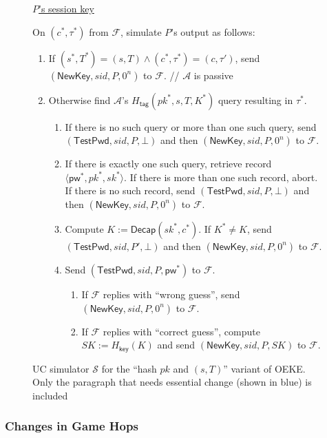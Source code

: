 \documentclass{article}
\theoremstyle{plain}
\theoremstyle{definition}
\theoremstyle{remark}
\newcommand{\adv}{\mathcal{A}}
\renewcommand{\sim}{\mathcal{S}}
\newcommand{\func}{\mathcal{F}}
\newcommand{\Decap}{\mathsf{Decap}}
\newcommand{\Hkey}{H_\mathsf{key}}
\newcommand{\Htag}{H_\mathsf{tag}}
\newcommand{\pw}{\mathsf{pw}}
\newcommand{\TestPwd}{\mathsf{TestPwd}}
\newcommand{\NewKey}{\mathsf{NewKey}}
\begin{document}
\begin{figure}[H]
\begin{framed}
\begin{small}
\underline{$P$'s session key}

\medskip
On $(c^*,\tau^*)$ from $\func$, simulate $P$'s output as follows:
\begin{enumerate}
  \item If $(s^*,T^*) = (s,T) \land (c^*,\tau^*) = (c,\tau')$, send $(\NewKey, sid, P, 0^n)$ to $\func$. \quad \textcolor[gray]{0.5}{// $\adv$ is passive}
  \item Otherwise find $\adv$'s {\color{blue}$\Htag(pk^*,s,T,K^*)$} query resulting in $\tau^*$.
      \begin{enumerate}
        \item If there is no such query or more than one such query, send $(\TestPwd, sid, P, \bot)$ and then $(\NewKey, sid, P, 0^n)$ to $\func$.
        \item If there is exactly one such query, retrieve record $\langle\pw^*,pk^*,sk^*\rangle$. {\color{blue}If there is more than one such record, abort.} If there is no such record, send $(\TestPwd, sid, P, \bot)$ and then $(\NewKey, sid, P, 0^n)$ to $\func$.
        \item Compute $K := \Decap(sk^*,c^*)$. If $K^* \neq K$, send $(\TestPwd, sid, P', \bot)$ and then $(\NewKey, sid, P, 0^n)$ to $\func$.
        \item Send $(\TestPwd, sid, P, \pw^*)$ to $\func$.
            \begin{enumerate}
              \item If $\func$ replies with ``wrong guess'', send $(\NewKey, sid, P, 0^n)$ to $\func$.
              \item If $\func$ replies with ``correct guess'', compute $SK := \Hkey(K)$ and send $(\NewKey, sid, P, SK)$ to $\func$.
            \end{enumerate}
      \end{enumerate}
\end{enumerate}
\end{small}
\end{framed}
\caption{UC simulator $\sim$ for the ``hash $pk$ and $(s,T)$'' variant of OEKE. Only the paragraph that needs essential change (shown in {\color{blue}blue}) is included}
\label{fig:oeke-sim-hash-pk-st}
\end{figure}

\subsubsection{Changes in Game Hops}
\label{sec:hash-pk-st-games}
\end{document}
